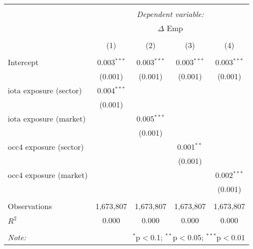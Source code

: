 \begin{tabular}{@{\extracolsep{5pt}}lcccc}
\\[-1.8ex]\hline
\hline \\[-1.8ex]
& \multicolumn{4}{c}{\textit{Dependent variable:}} \
\cr \cline{4-5}
\\[-1.8ex] & \multicolumn{4}{c}{$\Delta$ Emp}  \\
\\[-1.8ex] & (1) & (2) & (3) & (4) \\
\hline \\[-1.8ex]
 Intercept & 0.003$^{***}$ & 0.003$^{***}$ & 0.003$^{***}$ & 0.003$^{***}$ \\
  & (0.001) & (0.001) & (0.001) & (0.001) \\
 iota exposure (sector) & 0.004$^{***}$ & & & \\
  & (0.001) & & & \\
 iota exposure (market) & & 0.005$^{***}$ & & \\
  & & (0.001) & & \\
 occ4 exposure (sector) & & & 0.001$^{**}$ & \\
  & & & (0.001) & \\
 occ4 exposure (market) & & & & 0.002$^{***}$ \\
  & & & & (0.001) \\
\hline \\[-1.8ex]
 Observations & 1,673,807 & 1,673,807 & 1,673,807 & 1,673,807 \\
 $R^2$ & 0.000 & 0.000 & 0.000 & 0.000 \\
\hline
\hline \\[-1.8ex]
\textit{Note:} & \multicolumn{4}{r}{$^{*}$p$<$0.1; $^{**}$p$<$0.05; $^{***}$p$<$0.01} \\
\end{tabular}
